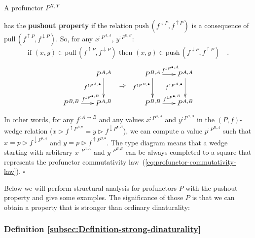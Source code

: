 A profunctor $P^{X,Y}$ %

{} has the \textbf{pushout property}
if the relation $\text{push}\,(f^{\downarrow P},f^{\uparrow P})$
is a consequence of $\text{pull}\,(f^{\uparrow P},f^{\downarrow P})$.
So, for any $x^{:P^{A,A}}$, $y^{:P^{B,B}}$:
\[
\text{if }(x,y)\in\text{pull}\,(f^{\uparrow P},f^{\downarrow P})\text{ then }(x,y)\in\text{push}\,(f^{\downarrow P},f^{\uparrow P})\quad.
\]
\[
\xymatrix{\xyScaleY{2.3pc}\xyScaleX{1.5pc} & P^{A,A}\ar[d]\sb(0.4){f^{\uparrow P^{A,\bullet}}} & \ar@{}[d]\sb(0.4){\displaystyle \Rightarrow} & P^{B,A}\ar[r]\sp(0.55){f^{\downarrow P^{\bullet,A}}}\ar[d]\sb(0.4){f^{\uparrow P^{B,\bullet}}} & P^{A,A}\ar[d]\sb(0.4){f^{\uparrow P^{A,\bullet}}}\\
P^{B,B}\ar[r]\sp(0.6){f^{\downarrow P^{\bullet,B}}} & P^{A,B} &  & P^{B,B}\ar[r]\sp(0.6){f^{\downarrow P^{\bullet,B}}} & P^{A,B}
}
\]

\noindent In other words, for any $f^{:A\rightarrow B}$ and any values
$x^{:P^{A,A}}$ and $y^{:P^{B,B}}$ in the $\left(P,f\right)$-wedge
relation ($x\triangleright f^{\uparrow P^{A,\bullet}}=y\triangleright f^{\downarrow P^{\bullet,B}}$),
we can compute a value $p^{:P^{B,A}}$ such that $x=p\triangleright f^{\downarrow P^{\bullet,A}}$
and $y=p\triangleright f^{\uparrow P^{B,\bullet}}$. The type diagram
means that a wedge starting with arbitrary $x^{:P^{A,A}}$ and $y^{:P^{B,B}}$
can be always completed to a square that represents the profunctor
commutativity law~(\ref{eq:profunctor-commutativity-law}). $\square$

Below we will perform structural analysis for profunctors $P$ with
the pushout property and give some examples. The significance of those
$P$ is that we can obtain a property that is stronger than ordinary
dinaturality:

\subsubsection{Definition \label{subsec:Definition-strong-dinaturality}\ref{subsec:Definition-strong-dinaturality}}

